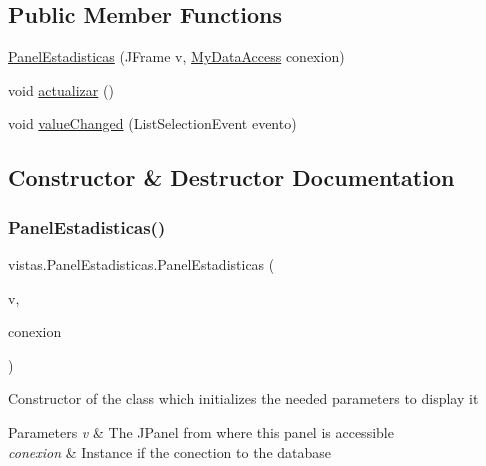 \subsection*{Public Member Functions}
\begin{DoxyCompactItemize}
\item 
\mbox{\hyperlink{classvistas_1_1_panel_estadisticas_a6b1628d4f2e0f5bf58d694e345895ed7}{Panel\+Estadisticas}} (J\+Frame v, \mbox{\hyperlink{classconexion_s_q_l_1_1_my_data_access}{My\+Data\+Access}} conexion)
\item 
void \mbox{\hyperlink{classvistas_1_1_panel_estadisticas_a3daac089d3c88691869b45d9c0961b30}{actualizar}} ()
\item 
void \mbox{\hyperlink{classvistas_1_1_panel_estadisticas_ad053d06b278eae5f7f54af0476ca0461}{value\+Changed}} (List\+Selection\+Event evento)
\end{DoxyCompactItemize}


\subsection{Constructor \& Destructor Documentation}
\mbox{\label{classvistas_1_1_panel_estadisticas_a6b1628d4f2e0f5bf58d694e345895ed7}} 
\subsubsection{\texorpdfstring{Panel\+Estadisticas()}{PanelEstadisticas()}}
{\footnotesize\ttfamily vistas.\+Panel\+Estadisticas.\+Panel\+Estadisticas (\begin{DoxyParamCaption}\item[{J\+Frame}]{v,  }\item[{\mbox{\hyperlink{classconexion_s_q_l_1_1_my_data_access}{My\+Data\+Access}}}]{conexion }\end{DoxyParamCaption})}

Constructor of the class which initializes the needed parameters to display it 
\begin{DoxyParams}{Parameters}
{\em v} & The J\+Panel from where this panel is accessible \\
\hline
{\em conexion} & Instance if the conection to the database \\
\hline
\end{DoxyParams}


